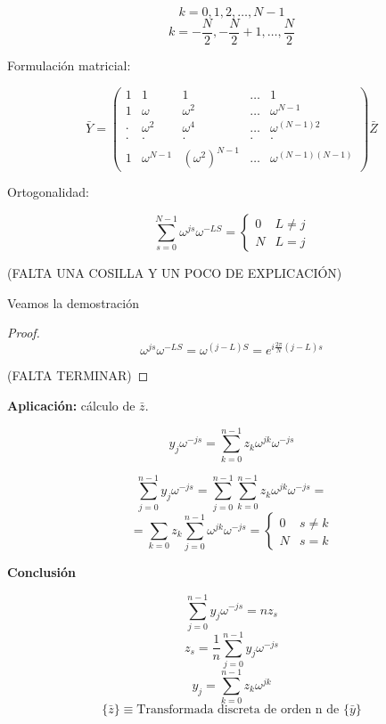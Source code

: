 			\[k=0,1,2,…,N-1\]
			\[k = -\frac{N}{2}, -\frac{N}{2}+1, … , \frac{N}{2}\]


			Formulación matricial:

			\[ \bar{Y} = \left(
			\begin{matrix}
				1 & 1 & 1 & … & 1 \\
				1 & \omega & \omega^2 & … & \omega^{N-1} \\
				· & \omega^2 & \omega^4 & … & \omega^{(N-1)2} \\
				· & · & · & · & · \\
				1 & \omega^{N-1} & (\omega^2)^{N-1} & … & \omega^{(N-1)(N-1)}
			\end{matrix} \right) \bar{Z}
			\]

			Ortogonalidad:

			\[ \sum_{s=0}^{N-1} \omega^{js} \omega^{-LS} = \begin{cases}
			0 & L \neq j\\
			N & L = j
			\end{cases} \]

			(FALTA UNA COSILLA Y UN POCO DE EXPLICACIÓN)

			Veamos la demostración

			\begin{proof}

			\[ \omega^{js} \omega^{-LS} = \omega^{(j-L)S} = e^{i\frac{2\pi}{N}(j-L)s}  \]

			(FALTA TERMINAR)

			\end{proof}



			\textbf{Aplicación:} cálculo de $\bar{z}$.

				\[ y_j\omega^{-js} = \sum_{k=0}^{n-1} z_k \omega^{jk} \omega^{-js} \]

				\[ \sum_{j=0}^{n-1} y_j \omega^{-js} = \sum_{j=0}^{n-1} \sum_{k=0}^{n-1} z_k \omega^{jk} \omega^{-js} = \]\[ = \sum_{k=0} z_k \sum_{j=0}^{n-1} \omega^{jk} \omega^{-js} = \begin{cases}
					0 & s \neq k\\
					N & s = k  \end{cases} \]

				\textbf{Conclusión}

				\[ \sum_{j=0}^{n-1} y_j \omega^{-js} = n z_s   \]
				\[ z_s = \frac{1}{n} \sum_{j=0}^{n-1} y_j \omega^{-js}   \]
				\[ y_j = \sum_{k=0}^{n-1} z_k \omega^{jk} \]
				\[ \{\bar{z}\} \equiv \text{Transformada discreta de orden n de } \{\bar{y}\} \]

